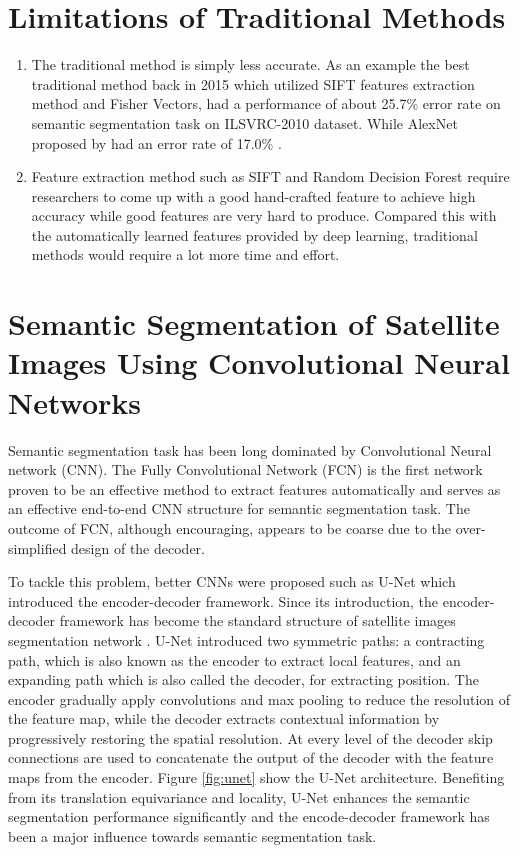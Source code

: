 \section{Limitations of Traditional Methods}
\begin{enumerate}
    \item The traditional method is simply less accurate. As an example the best traditional method back in 2015 which utilized SIFT features extraction method and Fisher Vectors, had a performance of about 25.7\% error rate on semantic segmentation task on ILSVRC-2010 dataset. While AlexNet proposed by \cite{alexnet} had an error rate of 17.0\% \cite{DBLP:journals/corr/Thoma16a}.
    \item  Feature extraction method such as SIFT and Random Decision Forest require researchers to come up with a good hand-crafted feature to achieve high accuracy while good features are very hard to produce. Compared this with the automatically learned features provided by deep learning, traditional methods would require a lot more time and effort.

\end{enumerate}

\section{Semantic Segmentation of Satellite Images Using Convolutional Neural Networks}

Semantic segmentation task has been long dominated by Convolutional Neural network (CNN). The Fully Convolutional Network (FCN) \cite{7298965} is the first network proven to be an effective method to extract features automatically and serves as an effective end-to-end CNN structure for semantic segmentation task. The outcome of FCN, although encouraging, appears to be coarse due to the over-simplified design of the decoder.

To tackle this problem, better CNNs were proposed such as U-Net \cite{unet} which  introduced the encoder-decoder framework. Since its introduction, the encoder-decoder framework has become the standard structure of satellite images segmentation network \cite{unetformer}. U-Net introduced two symmetric paths: a contracting path, which is also known as the encoder to extract local features, and an expanding path which is also called the decoder, for extracting position. The encoder gradually apply convolutions and max pooling to reduce the resolution of the feature map, while the decoder extracts contextual information by progressively restoring the spatial resolution. At every level of the decoder skip connections are used to concatenate the output of the decoder with the feature maps from the encoder. Figure \ref{fig:unet} show the U-Net architecture. Benefiting from its translation equivariance and locality, U-Net enhances the semantic segmentation performance significantly and the encode-decoder framework has been a major influence towards semantic segmentation task. 

